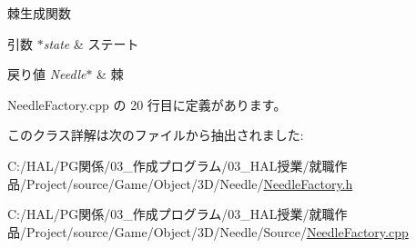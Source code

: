 棘生成関数 


\begin{DoxyParams}{引数}
{\em $\ast$state} & ステート \\
\hline
\end{DoxyParams}

\begin{DoxyRetVals}{戻り値}
{\em Needle$\ast$} & 棘 \\
\hline
\end{DoxyRetVals}


 Needle\+Factory.\+cpp の 20 行目に定義があります。



このクラス詳解は次のファイルから抽出されました\+:\begin{DoxyCompactItemize}
\item 
C\+:/\+H\+A\+L/\+P\+G関係/03\+\_\+作成プログラム/03\+\_\+\+H\+A\+L授業/就職作品/\+Project/source/\+Game/\+Object/3\+D/\+Needle/\mbox{\hyperlink{_needle_factory_8h}{Needle\+Factory.\+h}}\item 
C\+:/\+H\+A\+L/\+P\+G関係/03\+\_\+作成プログラム/03\+\_\+\+H\+A\+L授業/就職作品/\+Project/source/\+Game/\+Object/3\+D/\+Needle/\+Source/\mbox{\hyperlink{_needle_factory_8cpp}{Needle\+Factory.\+cpp}}\end{DoxyCompactItemize}
